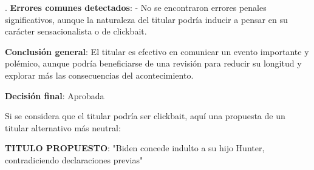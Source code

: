 \documentclass[10pt,a4paper]{article}
\begin{document}
\par{}. \textbf{Errores comunes detectados}:    - No se encontraron errores penales significativos, aunque la naturaleza del titular podr\'{i}a inducir a pensar en su car\'{a}cter sensacionalista o de clickbait.
\par\medskip
\textbf{Conclusi\'{o}n general}: El titular es efectivo en comunicar un evento importante y pol\'{e}mico, aunque podr\'{i}a beneficiarse de una revisi\'{o}n para reducir su longitud y explorar m\'{a}s las consecuencias del acontecimiento.
\par\medskip
\textbf{Decisi\'{o}n final}: Aprobada
\par\medskip
Si se considera que el titular podr\'{i}a ser clickbait, aqu\'{i} una propuesta de un titular alternativo m\'{a}s neutral:
\par\medskip
\textbf{TITULO PROPUESTO}: "Biden concede indulto a su hijo Hunter, contradiciendo declaraciones previas"
        \vspace{1em}
\vspace{1em}

\end{document}
